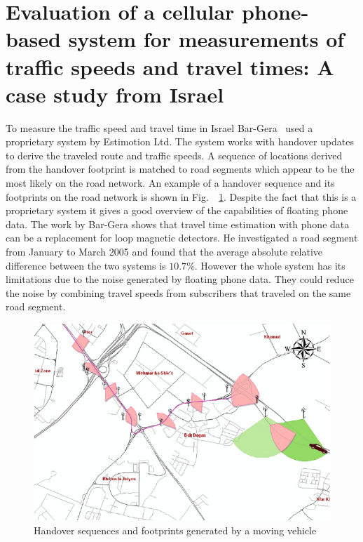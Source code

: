 \documentclass[master,english]{hgbthesis}
\begin{document}
\section{Evaluation of a cellular phone-based system for measurements of traffic speeds and travel times: A case study from Israel}
To measure the traffic speed and travel time in Israel Bar-Gera~\cite{Bar2007} used a proprietary system by Estimotion Ltd. The system works with handover updates to derive the traveled route and traffic speeds. A sequence of locations derived from the handover footprint is matched to road segments which appear to be the most likely on the road network. An example of a handover sequence and its footprints on the road network is shown in Fig.\ ~\ref{fig:bar}. Despite the fact that this is a proprietary system it gives a good overview of the capabilities of floating phone data. The work by Bar-Gera shows that travel time estimation with phone data can be a replacement for loop magnetic detectors. He investigated a road segment from January to March 2005 and found that the average absolute relative difference between the two systems is $10.7\%$. However the whole system has its limitations due to the noise generated by floating phone data. They could reduce the noise by combining travel speeds from subscribers that traveled on the same road segment.
\begin{figure}
\centering
\includegraphics[width=\linewidth]{images/bar.pdf}
\caption{Handover sequences and footprints generated by a moving vehicle~\cite{Bar2007}}
\label{fig:bar}
\end{figure}
\end{document}
